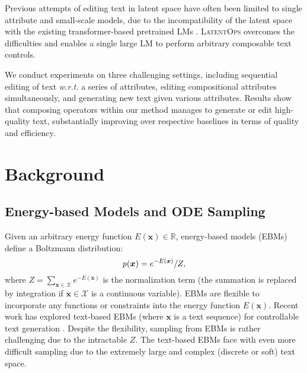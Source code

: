 \documentclass[11pt]{article}
\begin{document}
Previous attempts of editing text in latent space have often been limited to single attribute and small-scale models, due to the incompatibility of the latent space with the existing transformer-based pretrained LMs \cite{DBLP:conf/nips/WangH019,DBLP:conf/aaai/LiuFZPL20, DBLP:conf/icml/ShenMBJ20,DBLP:conf/acl/DuanXPHL20,DBLP:conf/emnlp/MaiPMSH20}. \textsc{LatentOps} overcomes the difficulties and enables a single large LM to perform arbitrary composable text controls.

We conduct experiments on three challenging settings, including sequential editing of text \emph{w.r.t.} a series of attributes, editing compositional attributes simultaneously, and generating new text given various attributes. Results show that composing operators within our method manages to generate or edit high-quality text, substantially improving over respective baselines in terms of quality and efficiency.

















 \label{sec:intro}

\section{Background}


\subsection{Energy-based Models and ODE Sampling}
\label{sec:bg_ebms}
Given an arbitrary energy function $E(\bm x)\in \mathbb{R}$, energy-based models (EBMs) define a Boltzmann distribution:
\begin{equation}
\small
\setlength\abovedisplayskip{0.1cm}
\setlength\belowdisplayskip{0.2cm}
\label{eq:def_ebm}
    p(\bm x) = e^{-E(\bm x)} / Z, \end{equation}
where $Z=\sum_{\bm{x} \in \mathcal{X}} e^{-E(\bm x)}$ is the normalization term (the summation is replaced by integration if $\bm x  \in \mathcal{X}$ is a continuous variable). 
EBMs are flexible to incorporate any functions or constraints into the energy function $E(\bm x)$. Recent work has explored text-based EBMs (where $\bm x$ is a text sequence) for controllable text generation \cite{DBLP:conf/nips/HuYSQLDX18,DBLP:conf/iclr/DengBOSR20,DBLP:journals/corr/abs-2106-15078,DBLP:conf/iclr/KhalifaED21,DBLP:journals/corr/abs-2203-13299,QinCOLD}.
Despite the flexibility, sampling from EBMs is rather challenging due to the intractable $Z$. The text-based EBMs
face with even more difficult sampling due to the extremely large and complex (discrete or soft) text space.
\end{document}
